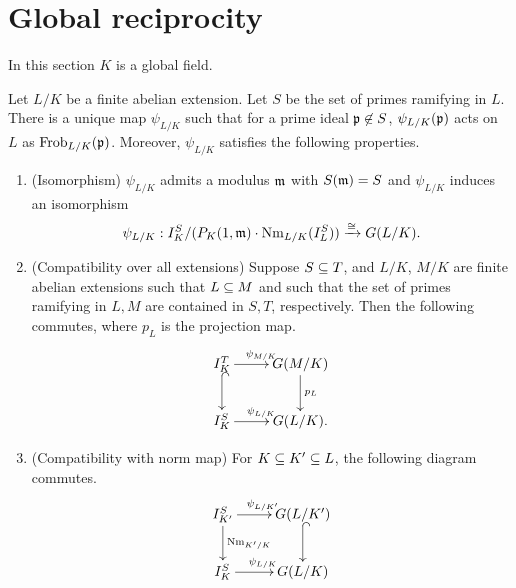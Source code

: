 \section{Global reciprocity}
In this section $K$ is a global field.
\begin{thm}
Let $L/K$ be a finite abelian extension. Let $S$ be the set of primes ramifying in $L$. There is a unique map $\psi_{L/K}$ such that for a prime ideal $\mathfrak{p}\not\in S$, $\psi_{L/K}(\mathfrak{p})$ acts on $L$ as $\operatorname{Frob}_{L/K}(\mathfrak{p})$.
Moreover, $\psi_{L/K}$ satisfies the following properties.
\begin{enumerate}
\item (Isomorphism)
$\psi_{L/K}$ admits a modulus $\mathfrak{m}$ with $S(\mathfrak{m})=S$ and 
$\psi_{L/K}$ induces an isomorphism
\[
\psi_{L/K}:I_K^S/(P_K(1,{\mathfrak{m}})\cdot \operatorname{Nm}_{L/K}(I_L^{S}))
\xrightarrow{\cong}G(L/K).
\]
\item (Compatibility over all extensions) Suppose $S\subseteq T$, and $L/K$, $M/K$ are finite abelian extensions such that $L\subseteq M$ and such that the set of primes ramifying in $L,M$ are contained in $S,T$, respectively. Then the following commutes, where $p_L$ is the projection map.
\[
\xymatrix{
I_K^{T} \ar[r]^{\psi_{M/K}}\ar@{^(->}[d] & G(M/K)\ar[d]^{p_L}\\
I_K^S \ar[r]^{\psi_{L/K}} & G(L/K).
}
\]
\item (Compatibility with norm map)
For $K\subseteq K'\subseteq L$, the following diagram commutes.
\[
\xymatrix{
I_{K'}^S \ar[r]^{\psi_{L/K'}} \ar[d]^{\nm_{K'/K}} & G(L/K')\ar@{^(->}[d]\\
I_K^S \ar[r]^{\psi_{L/K}}& G(L/K)
}
\]
\end{enumerate}
\end{thm}
